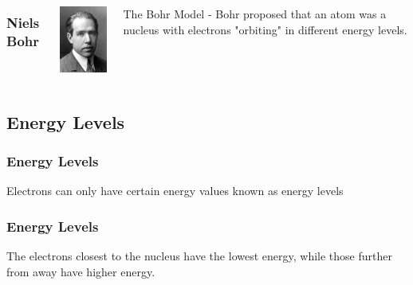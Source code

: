 \documentclass{beamer}
\begin{document}
\begin{frame}
    \begin{columns}
        \frametitle{Niels Bohr}
        \begin{column}{0.5\textwidth}
            \includegraphics[width=3cm]{../../../../public/images/chemists/Bohr.jpg}
        \end{column}
        \begin{column}{0.5\textwidth}
            The Bohr Model - Bohr proposed that an atom was a nucleus with electrons "orbiting" in different 
            \pause \alert{energy levels}.
            \vspace{1cm}

        
        \end{column}
    \end{columns}
\end{frame}

\subsection{Energy Levels}

\begin{frame}
    \frametitle{Energy Levels}
    \onslide Electrons can only have certain energy values known as
    \pause \alert{energy levels} 
\end{frame}

\begin{frame}
    \frametitle{Energy Levels}
    \onslide The electrons closest to the nucleus have the 
    \pause \alert{lowest} 
    \onslide energy, while those further from away have 
    \pause\alert{higher} 
    \onslide energy.
    \vspace{.5cm}

    
\end{frame}
\end{document}
